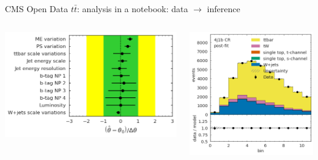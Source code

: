 \documentclass[aspectratio=169]{beamer}
\begin{document}
\begin{frame}{CMS Open Data $t\bar{t}$: analysis in a notebook: data $\to$ inference}
\begin{columns}
\begin{columns}
\vfill
\includegraphics[width=\linewidth]{PLOTS/gac-ttbar-plot-4.png}

\vfill
\includegraphics[width=\linewidth]{PLOTS/gac-ttbar-plot-7.png}


\end{columns}
\end{columns}
\end{frame}
\end{document}
